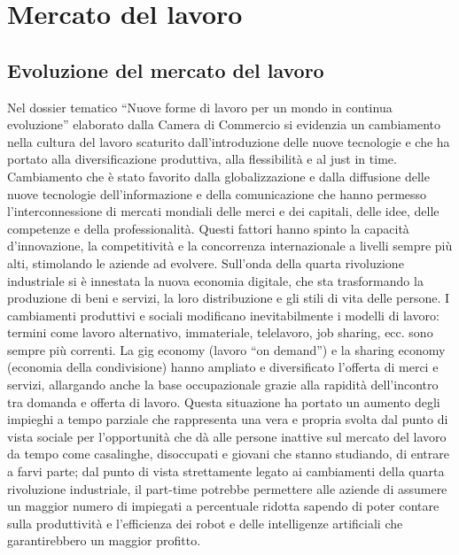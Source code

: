 \section{Mercato del lavoro}
\subsection{Evoluzione del mercato del lavoro}
Nel dossier tematico “Nuove forme di lavoro per un mondo in continua evoluzione” elaborato dalla Camera di Commercio si evidenzia un cambiamento nella cultura del lavoro scaturito dall’introduzione delle nuove tecnologie e che ha portato alla diversificazione produttiva, alla flessibilità e al just in time. Cambiamento che è stato favorito dalla globalizzazione e dalla diffusione delle nuove tecnologie dell’informazione e della comunicazione che hanno permesso l’interconnessione di mercati mondiali delle merci e dei capitali, delle idee, delle competenze e della professionalità. Questi fattori hanno spinto la capacità d’innovazione, la competitività e la concorrenza internazionale a livelli sempre più alti, stimolando le aziende ad evolvere. Sull’onda della quarta rivoluzione industriale si è innestata la nuova economia digitale, che sta trasformando la produzione di beni e servizi, la loro distribuzione e gli stili di vita delle persone. I cambiamenti produttivi e sociali modificano inevitabilmente i modelli di lavoro: termini come lavoro alternativo, immateriale, telelavoro, job sharing, ecc. sono sempre più correnti. La gig economy (lavoro “on demand”) e la sharing economy (economia della condivisione) hanno ampliato e diversificato l’offerta di merci e servizi, allargando anche la base occupazionale grazie alla rapidità dell’incontro tra domanda e offerta di lavoro. Questa situazione ha portato un aumento degli impieghi a tempo parziale che rappresenta una vera e propria svolta dal punto di vista sociale per l’opportunità che dà alle persone inattive sul mercato del lavoro da tempo come casalinghe, disoccupati e giovani che stanno studiando, di entrare a farvi parte; dal punto di vista strettamente legato ai cambiamenti della quarta rivoluzione industriale, il part-time potrebbe permettere alle aziende di assumere un maggior numero di impiegati a percentuale ridotta sapendo di poter contare sulla produttività e l’efficienza dei robot e delle intelligenze artificiali che garantirebbero un maggior profitto.
